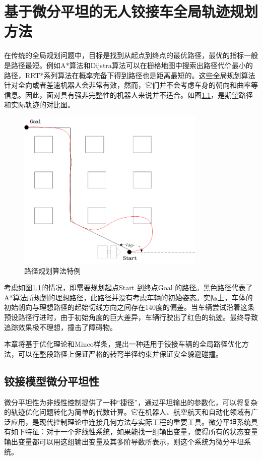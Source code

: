 \documentclass[master,academic]{ysuthesis} %
\begin{document}
	\chapter{基于微分平坦的无人铰接车全局轨迹规划方法}
		在传统的全局规划问题中，目标是找到从起点到终点的最优路径，最优的指标一般是路径最短。例如A*算法和Dijstra算法可以在栅格地图中搜索出路径代价最小的路径，RRT*系列算法在概率完备下得到路径也是距离最短的。这些全局规划算法针对全向或者差速机器人会非常有效，然而，它们并不会考虑车身的朝向和曲率等信息。因此，面对具有强非完整性的机器人来说并不适合。如图\ref{fig:路径规划算法特例}，是期望路径和实际轨迹的对比图。
		\begin{figure}[!ht]
			\centering
			\includegraphics[width=0.8\textwidth]{路径规划算法特例.png}
			\caption{路径规划算法特例}
			\label{fig:路径规划算法特例}
		\end{figure}

		考虑如图\ref{fig:路径规划算法特例}的情况，即需要规划起点Start 到终点Goal 的路径。黑色路径代表了A*算法所规划的理想路径，此路径并没有考虑车辆的初始姿态。实际上，车体的初始朝向与理想路径的起始切线方向之间存在140度的偏差。当车辆尝试沿着这条预设路径行进时，由于初始角度的巨大差异，车辆行驶出了红色的轨迹。最终导致追踪效果极不理想，撞击了障碍物。
		
		本章将基于优化理论和Minco样条，提出一种适用于铰接车辆的全局路径优化方法，可以在整段路径上保证严格的转弯半径约束并保证安全躲避碰撞。
		
	\section{铰接模型微分平坦性}
		微分平坦性为非线性控制提供了一种“捷径”，通过平坦输出的参数化，可以将复杂的轨迹优化问题转化为简单的代数计算。它在机器人、航空航天和自动化领域有广泛应用，是现代控制理论中连接几何方法与实际工程的重要工具。微分平坦系统具有如下特征：对于一个非线性系统，如果能找一组输出变量，使得所有的状态变量输出变量都可以用这组输出变量及其多阶导数所表示，则这个系统为微分平坦系统。
\end{document}
